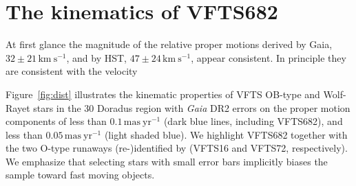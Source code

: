 \documentclass[apjl,twocolumn]{emulateapj}
\newcommand{\kms}{{\,\mathrm{km\ s^{-1}}}}
\newcommand{\masyr}{\,\mathrm{mas}\,\mathrm{yr}^{-1}}
\begin{document}




\section{The kinematics of VFTS682}
\label{sec:results}

At first glance the magnitude of the relative proper motions derived by Gaia,  $32\pm 21\kms$, and by HST, $47 \pm 24\kms$, appear consistent.  In principle they are consistent with the velocity





Figure~\ref{fig:dist} illustrates the kinematic properties of VFTS OB-type
and Wolf-Rayet stars in the 30 Doradus region with \emph{Gaia} DR2 errors on the proper motion
components of less than $0.1\,\mathrm{mas\ yr^{-1}}$ (dark blue lines,
including VFTS682), and less than $0.05\,\mathrm{mas\ yr^{-1}}$ (light shaded
blue). We highlight VFTS682 together with the two O-type
runaways \mbox{(re-)identified} by \cite{lennon:18} (VFTS16 and VFTS72,
respectively). We emphasize that selecting stars with small error bars
implicitly biases the sample toward fast moving objects.
\end{document}
